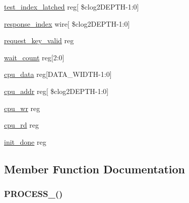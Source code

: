 \begin{DoxyCompactItemize}
\item 
\mbox{\hyperlink{enumbinary__search__tb_a2078db9c91f7c7f69755bfb791850765}{test\+\_\+index\+\_\+latched}} reg\mbox{[} \$clog2\+D\+E\+P\+TH-\/1\+:0\mbox{]}
\item 
\mbox{\hyperlink{enumbinary__search__tb_add4396c2f76da13db52c737030c183af}{response\+\_\+index}} wire\mbox{[} \$clog2\+D\+E\+P\+TH-\/1\+:0\mbox{]}
\item 
\mbox{\hyperlink{enumbinary__search__tb_aedbfae3fc907ebe52e22fe368bb8998f}{request\+\_\+key\+\_\+valid}} reg
\item 
\mbox{\hyperlink{enumbinary__search__tb_ab7c6c4f4e41027e2ab46a9531402fe66}{wait\+\_\+count}} reg\mbox{[}2\+:0\mbox{]}
\item 
\mbox{\hyperlink{enumbinary__search__tb_a19628ba8402e042b55f2c844586edfb9}{cpu\+\_\+data}} reg\mbox{[}D\+A\+T\+A\+\_\+\+W\+I\+D\+TH-\/1\+:0\mbox{]}
\item 
\mbox{\hyperlink{enumbinary__search__tb_a5e0629d67883cbd861305185e6af3cbe}{cpu\+\_\+addr}} reg\mbox{[} \$clog2\+D\+E\+P\+TH-\/1\+:0\mbox{]}
\item 
\mbox{\hyperlink{enumbinary__search__tb_aab06c31ae3c20c2728995ed2bdc4d938}{cpu\+\_\+wr}} reg
\item 
\mbox{\hyperlink{enumbinary__search__tb_a757f69c7d26265dc1e79f5297b6134ed}{cpu\+\_\+rd}} reg
\item 
\mbox{\hyperlink{enumbinary__search__tb_a5117977ac113d88efb1ecefae610b4b6}{init\+\_\+done}} reg
\end{DoxyCompactItemize}


\subsection{Member Function Documentation}
\mbox{\label{enumbinary__search__tb_a75170e052c291ff4de20a9154177d7ab}} 
\subsubsection{\texorpdfstring{P\+R\+O\+C\+E\+S\+S\+\_()}{PROCESS\_0()}}
{\footnotesize\ttfamily \hspace{0.3cm}}

\mbox{\label{enumbinary__search__tb_a663d8c3c055c8dbfef5b94aeffb17fec}} 
